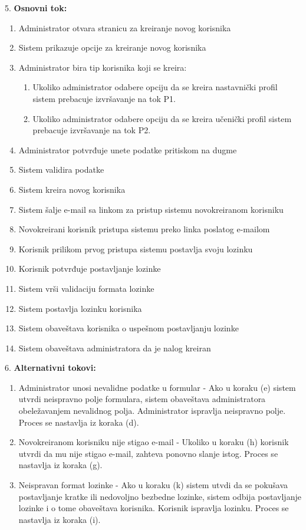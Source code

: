 \documentclass{article}
\begin{document}
5. \textbf{Osnovni tok:} 
\begin{enumerate} [label=(\alph*)]
\item Administrator otvara stranicu za kreiranje novog korisnika
\item Sistem prikazuje opcije za kreiranje novog korisnika
\item Administrator bira tip korisnika koji se kreira:
\begin{enumerate} [label=(\roman*)]
    \item Ukoliko administrator odabere opciju da se kreira nastavnički profil sistem prebacuje izvršavanje na tok P1.
    \item Ukoliko administrator odabere opciju da se kreira učenički profil sistem prebacuje izvršavanje na tok P2.
\end{enumerate}
\item Administrator potvrđuje unete podatke pritiskom na dugme
\item Sistem validira podatke
\item Sistem kreira novog korisnika
\item Sistem šalje e-mail sa linkom za pristup sistemu novokreiranom korisniku
\item Novokreirani korisnik pristupa sistemu preko linka poslatog e-mailom
\item Korisnik prilikom prvog pristupa sistemu postavlja svoju lozinku
\item Korisnik potvrđuje postavljanje lozinke
\item Sistem vrši validaciju formata lozinke
\item Sistem postavlja lozinku korisnika
\item Sistem obaveštava korisnika o uspešnom postavljanju lozinke
\item Sistem obaveštava administratora da je nalog kreiran
\end{enumerate}

6. \textbf{Alternativni tokovi:}
\begin{enumerate} [label=(\roman*)]
\item Administrator unosi nevalidne podatke u formular - Ako u koraku (e) sistem utvrdi neispravno polje formulara, sistem obaveštava administratora obeležavanjem nevalidnog polja. Administrator ispravlja neispravno polje. Proces se nastavlja iz koraka (d).
\item Novokreiranom korisniku nije stigao e-mail - Ukoliko u koraku (h) korisnik utvrdi da mu nije stigao e-mail, zahteva ponovno slanje istog. Proces se nastavlja iz koraka (g).
\item Neispravan format lozinke - Ako u koraku (k) sistem utvdi da se pokušava postavljanje kratke ili nedovoljno bezbedne lozinke, sistem odbija postavljanje lozinke i o tome obaveštava korisnika. Korisnik ispravlja lozinku. Proces se nastavlja iz koraka (i).
\end{enumerate}
\end{document}
